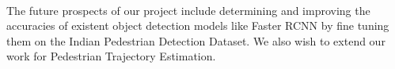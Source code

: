 \paragraph{}The future prospects of our project include determining and improving the accuracies of existent object detection models like Faster RCNN by fine tuning them on the Indian Pedestrian Detection Dataset. We also wish to extend our work for Pedestrian Trajectory Estimation. 

